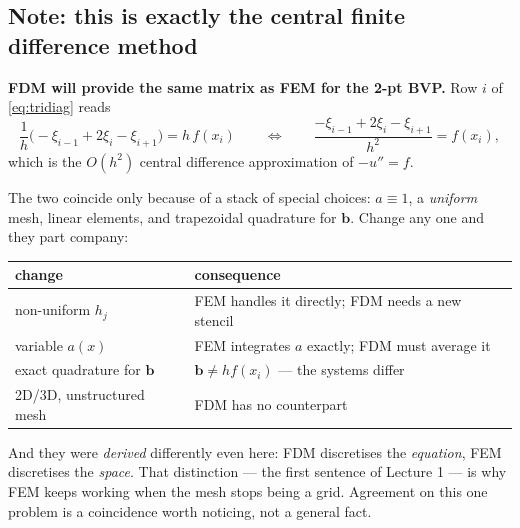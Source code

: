 \subsection*{Note: this is exactly the central finite difference method}

\noindent\textbf{FDM will provide the same matrix as FEM for the 2-pt BVP.} Row
$i$ of \eqref{eq:tridiag} reads
\begin{equation}
  \frac{1}{h}\bigl(-\xi_{i-1}+2\xi_{i}-\xi_{i+1}\bigr) = h\,f(x_{i})
  \qquad\Longleftrightarrow\qquad
  \frac{-\xi_{i-1}+2\xi_{i}-\xi_{i+1}}{h^{2}} = f(x_{i}),
\end{equation}
which is the $O(h^{2})$ central difference approximation of $-u''=f$.


\begin{pitfall}
The two coincide only because of a stack of special choices: $a\equiv1$, a
\emph{uniform} mesh, linear elements, and trapezoidal quadrature for $\bm b$.
Change any one and they part company:
\begin{center}\small
\renewcommand{\arraystretch}{1.2}
\begin{tabular}{@{}ll@{}}
\toprule
\textbf{change} & \textbf{consequence}\\
\midrule
non-uniform $h_{j}$      & FEM handles it directly; FDM needs a new stencil\\
variable $a(x)$          & FEM integrates $a$ exactly; FDM must average it\\
exact quadrature for $\bm b$ & $\bm b\ne h f(x_{i})$ --- the systems differ\\
2D/3D, unstructured mesh & FDM has no counterpart\\
\bottomrule
\end{tabular}
\end{center}

\noindent
And they were \emph{derived} differently even here: FDM discretises the
\emph{equation}, FEM discretises the \emph{space}. That distinction --- the
first sentence of Lecture 1 --- is why FEM keeps working when the mesh stops
being a grid. Agreement on this one problem is a coincidence worth noticing,
not a general fact.
\end{pitfall}
